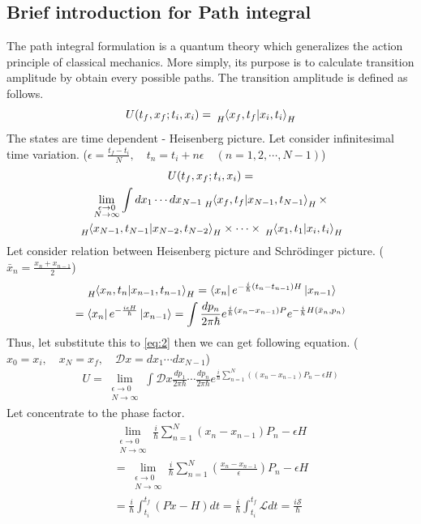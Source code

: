 \documentclass[%
 reprint,
 amsmath,amssymb,
 aps,
]{revtex4-1}
\begin{document}
\subsection{\label{sec:level2.1}Brief introduction for Path integral}
The path integral formulation is a quantum theory which generalizes the action principle of classical mechanics. More simply, its purpose is to calculate transition amplitude by obtain every possible paths. The transition amplitude is defined as follows.
\begin{equation}\label{eq:1}
U(t_f, x_f ; t_i, x_i)= \tensor[_H]{\braket{x_f, t_f | x_i, t_i}}{_H}
\end{equation}
The states are time dependent - Heisenberg picture. Let consider infinitesimal time variation.
(\(\epsilon=\frac{t_f-t_i}{N}, \quad t_n=t_i+n\epsilon \quad (n=1,2,\cdots,N-1)\))
\begin{multline}\label{eq:2}
U(t_f, x_f ; t_i, x_i) = \\\lim_{\substack{\epsilon \to 0 \\ N \to \infty}}\int dx_1 \cdots dx_{N-1} \tensor[_H]{\braket{x_f,t_f|x_{N-1},t_{N-1}}}{_H}\times \\ \tensor[_H]{\braket{x_{N-1},t_{N-1}|x_{N-2},t_{N-2}}}{_H}\times \cdots \times \tensor[_H]{\braket{x_1,t_1|x_i,t_i}}{_H}\\
\end{multline}
Let consider relation between Heisenberg picture and Schr{\"o}dinger picture. (\(\bar{x}_n = \frac{x_n+x_{n-1}}{2}\))
\begin{multline*}
\tensor[_H]{\braket{x_n,t_n|x_{n-1},t_{n-1}}}{_H}=\bra{x_n}e^{-\frac{i}{\hbar}(t_n-t_{n-1})H}\ket{x_{n-1}}
\\=\bra{x_n}e^{-\frac{i\epsilon H}{\hbar}}\ket{x_{n-1}}=\int \frac{dp_n}{2\pi\hbar}e^{\frac{i}{\hbar}(x_n-x_{n-1})P}e^{-\frac{i}{\hbar}H(\bar{x}_n,p_n)}
\end{multline*}
Thus, let substitute this to \eqref{eq:2} then we can get following equation. (\(x_0=x_i, \quad x_N=x_f, \quad \mathcal{D}x=dx_1 \cdots dx_{N-1}\))
\begin{multline}\label{eq:3}
U=\lim_{\substack{\epsilon \to 0 \\ N \to \infty}}\int \mathcal{D}x\frac{dp_1}{2\pi\hbar}\cdots\frac{dp_n}{2\pi\hbar}
e^{\frac{i}{\hbar}\sum_{n=1}^{N}((x_n-x_{n-1})P_n-\epsilon H)}
\end{multline}
Let concentrate to the phase factor.
\begin{multline}\label{eq:4}
\lim_{\substack{\epsilon \to 0 \\ N \to \infty}}\frac{i}{\hbar}\sum_{n=1}^{N}(x_n-x_{n-1})P_n-\epsilon H\\=\lim_{\substack{\epsilon \to 0 \\ N \to \infty}}\frac{i}{\hbar}\sum_{n=1}^{N}(\frac{x_n-x_{n-1}}{\epsilon})P_n-\epsilon H\\=\frac{i}{\hbar}\int_{t_i}^{t_f}(P\dot{x}-H)dt = \frac{i}{\hbar}\int_{t_i}^{t_f}\mathcal{L}dt=\frac{i\mathcal{S}}{\hbar}
\end{multline}
\end{document}
